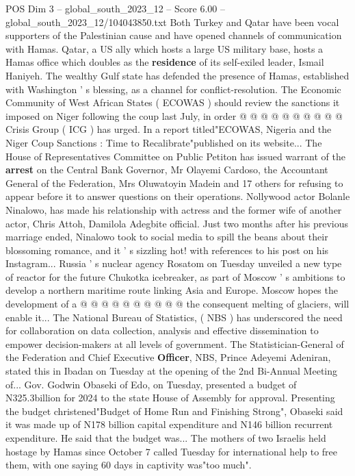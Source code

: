 \begin{textsample}{POS Dim 3 – global\_south\_2023\_12 – Score 6.00 – global\_south\_2023\_12/104043850.txt}
Both Turkey and Qatar have been vocal supporters of the Palestinian cause and have opened channels of communication with Hamas.
Qatar, a US ally which hosts a large US military base, hosts a Hamas office which doubles as the \textbf{residence} of its self-exiled leader, Ismail Haniyeh.
The wealthy Gulf state has defended the presence of Hamas, established with Washington ' s blessing, as a channel for conflict-resolution.
The Economic Community of West African States ( ECOWAS ) should review the sanctions it imposed on Niger following the coup last July, in order @ @ @ @ @ @ @ @ @ @ Crisis Group ( ICG ) has urged.
In a report titled"ECOWAS, Nigeria and the Niger Coup Sanctions : Time to Recalibrate"published on its website...
The House of Representatives Committee on Public Petiton has issued warrant of the \textbf{arrest} on the Central Bank Governor, Mr Olayemi Cardoso, the Accountant General of the Federation, Mrs Oluwatoyin Madein and 17 others for refusing to appear before it to answer questions on their operations.
Nollywood actor Bolanle Ninalowo, has made his relationship with actress and the former wife of another actor, Chris Attoh, Damilola Adegbite official.
Just two months after his previous marriage ended, Ninalowo took to social media to spill the beans about their blossoming romance, and it ' s sizzling hot! with references to his post on his Instagram...
Russia ' s nuclear agency Rosatom on Tuesday unveiled a new type of reactor for the future Chukotka icebreaker, as part of Moscow ' s ambitions to develop a northern maritime route linking Asia and Europe.
Moscow hopes the development of a @ @ @ @ @ @ @ @ @ @ the consequent melting of glaciers, will enable it...
The National Bureau of Statistics, ( NBS ) has underscored the need for collaboration on data collection, analysis and effective dissemination to empower decision-makers at all levels of government.
The Statistician-General of the Federation and Chief Executive \textbf{Officer}, NBS, Prince Adeyemi Adeniran, stated this in Ibadan on Tuesday at the opening of the 2nd Bi-Annual Meeting of...
Gov.
Godwin Obaseki of Edo, on Tuesday, presented a budget of N325.3billion for 2024 to the state House of Assembly for approval.
Presenting the budget christened"Budget of Home Run and Finishing Strong", Obaseki said it was made up of N178 billion capital expenditure and N146 billion recurrent expenditure.
He said that the budget was...
The mothers of two Israelis held hostage by Hamas since October 7 called Tuesday for international help to free them, with one saying 60 days in captivity was"too much".

\end{textsample}
